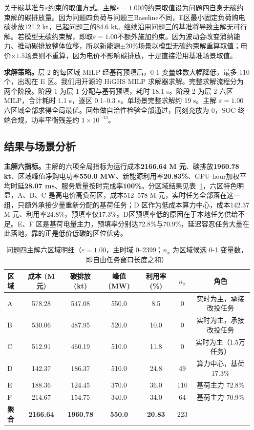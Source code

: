 关于碳基准与$\varepsilon$约束的取值方式。主解$\varepsilon=1.00$的约束取值设为问题四自身无碳约束解的碳排放量。因为问题四负荷与问题三Baseline不同，E区最小固定负荷购电碳排放121.2 kt，已超问题三的84.6 kt。继续沿用问题三的基准将导致主解无可行解。若模型无碳约束解，即取$\varepsilon=1.00$不额外施加约束。因为波动会改变消纳能力、推动碳排放整体位移，所以新能源$\pm20\%$场景以模型无碳约束解重算取值；电价$\times1.5$场景则不重算，因为电价不影响碳排放，于是直接沿用基准场景取值。

\medskip\noindent\textbf{求解策略。}层 2 的每区域 MILP 经基荷预填后，0-1 变量维数大幅降低，最多 110 个，出现在 E 区。我们用开源的 HiGHS MILP 求解器求解。完整求解流程分为两个阶段。阶段 1 为层 1 分配与基荷预填，耗时 18.1 s。阶段 2 为层 2 六区 MILP，合计耗时 1.1 s，逐区 0.1--0.3 s。单场景完整求解约 19 s。主解 $\varepsilon=1.00$ 六区域全部求得全局最优。回带做自洽性检验全部通过，同刻充放为 0，SOC 终端合规，功率平衡残差约 $1\times10^{-13}$。

\subsection{结果与场景分析}

\medskip\noindent\textbf{主解六指标。}主解的六项全局指标为运行成本\textbf{2166.64 M 元}、碳排放\textbf{1960.78 kt}、区域峰值净购电功率\textbf{550.0 MW}、新能源利用率\textbf{20.83\%}、GPU-hour加权平均时延\textbf{28.07 ms}、服务质量按时完成率\textbf{100\%}。分区域结果见表~\ref{tab:sub4-main}，六区特色明显，A、B、C 是高电价高负荷区，成本512--578 M 元，实时任务全部落在这一组，只额外承接少量重新分配的基荷任务；D 区作为低成本算力中心，成本142.37 M 元、利用率24.8\%，预填率仅17.3\%。D区预填率低的原因在于本地任务供给不足。E、F 区是基荷电量主力，预填率分别达72.8\%与70.9\%，延迟容忍任务大量在此落地，靠的正是低价低碳的区位优势。

\begin{table}[H]
\centering
\footnotesize
\caption{问题四主解六区域明细（$\varepsilon=1.00$，主时域 0--2399；$n_x$ 为区域候选 0-1 变量数，即自由任务窗口长度之和）}
\label{tab:sub4-main}
\begin{tabular}{lcccccc}
\toprule
区域 & 成本 (M元) & 碳排放 (kt) & 峰值 (MW) & 利用率 (\%) & $n_x$ & 角色 \\
\midrule
A & 578.28 & 547.08 & 550.0 & 8.5 & 0 & 实时为主，承接改投任务 \\
B & 530.06 & 487.95 & 520.0 & 10.0 & 0 & 实时为主，承接改投任务 \\
C & 512.91 & 460.19 & 510.0 & 11.8 & 0 & 实时为主（1.5万任务） \\
D & 142.37 & 186.37 & 510.0 & 24.8 & 49 & 算力中心，基荷 17.3\% \\
E & 188.36 & 124.45 & 370.0 & 36.0 & 110 & 基荷主力 72.8\% \\
F & 214.67 & 154.75 & 340.0 & 34.0 & 64 & 基荷主力 70.9\% \\
\midrule
\textbf{聚合} & \textbf{2166.64} & \textbf{1960.78} & \textbf{550.0} & \textbf{20.83} & 223 & \\
\bottomrule
\end{tabular}
\end{table}

